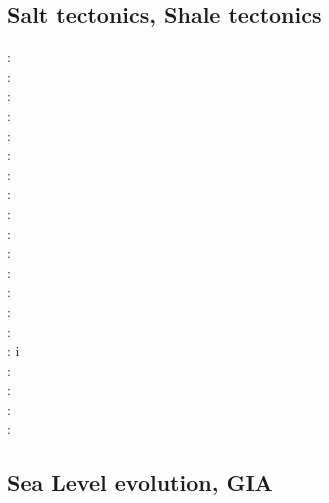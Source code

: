 \subsection{Salt tectonics, Shale tectonics}

\begin{scriptsize}
\nineteenseventyeight: \cite{woid78}\\
\nineteenninetyone: \cite{tars91}\\
\nineteenninetytwo: \cite{zaju92}\\
\nineteenninetythree: \cite{nabr93}\cite{vasv93}\cite{wejv93}\cite{wein93}\\
\nineteenninetysix: \cite{maar96}\\
\nineteenninetyeight: \cite{giju98}\\
\twothousandfour: \cite{istt04}\cite{geim04}\cite{mcmg04}\\
\twothousandfive: \cite{gebi05}\\
\twothousandsix: \cite{maqs06}\\
\twothousandseven: \cite{huja07}\cite{maqs07}\\
\twothousandnine: \cite{grba09}\\
\twothousandten: \cite{albe10}\cite{albi10}\cite{inbe10}\cite{inbe10b}\cite{albs10}\\
\twothousandeleven: \cite{brfo11}\\
\twothousandtwelve: \cite{fejr12}\cite{liqi12}\cite{grbe12}\cite{albe12}\cite{grbi12}\cite{goib12}\cite{rukb12}\\
\twothousandthirteen: \cite{gobi13}\cite{nipc13}\\
\twothousandfourteen: \cite{bakp14}\cite{feka14a}\cite{feka14b}\cite{ghbu14}\cite{nifh14}i\cite{peel14}\\
\twothousandfifteen: \cite{feka15}\cite{cofk15}\\
\twothousandsixteen: \cite{masg16}\cite{albe16}\\
\twothousandseventeen: \cite{grbe17}\cite{henf17}\\
\twothousandnineteen: \cite{hadv19}\cite{clcc19}
\end{scriptsize}

\subsection{Sea Level evolution, GIA}

